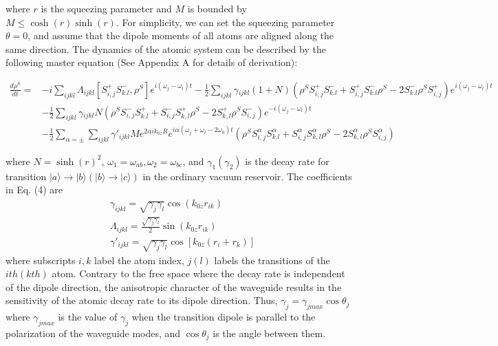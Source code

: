 \documentclass[aps,showpacs,twocolumn,twoside,groupedaddress]{revtex4}
\begin{document}
where $r$ is the squeezing parameter and $M$ is bounded by $M\leq\cosh(r)\sinh(r)$. For simplicity, we can set the squeezing parameter $\theta=0$, and assume that the dipole moments of all atoms are aligned along the same direction. The dynamics of the atomic system can be described by the following master equation (See Appendix A for details of derivation):
\begin{widetext}
\begin{equation}
\label{eq1}
\begin{split}
\frac{d\rho^{S}}{dt}=&-i\underset{ijkl}{\sum}\Lambda_{ijkl}[S_{i,j}^{+}S_{k.l}^{-},\rho^{S}]e^{i(\omega_{j}-\omega_{l})t}-\frac{1}{2}\underset{ijkl}{\sum}\gamma{}_{ijkl}(1+N)(\rho^{S}S_{i,j}^{+}S_{k.l}^{-}+S_{i,j}^{+}S_{k.l}^{-}\rho^{S}-2S_{k.l}^{-}\rho^{S}S_{i,j}^{+})e^{i(\omega_{j}-\omega_{l})t}\\
&-\frac{1}{2}\underset{ijkl}{\sum}\gamma{}_{ijkl}N(\rho^{S}S_{i,j}^{-}S_{k.l}^{+}+S_{i,j}^{-}S_{k,l}^{+}\rho^{S}-2S_{k,l}^{+}\rho^{S}S_{i,j}^{-})e^{-i(\omega_{j}-\omega_{l})t}\\
&-\frac{1}{2}\sum_{\alpha=\pm}\underset{ijkl}{\sum}\gamma'_{ijkl}Me^{2\alpha ik_{0z}R}e^{i\alpha(\omega_{j}+\omega_{l}-2\omega_{0})t}(\rho^{S}S_{i,j}^{\alpha}S_{k.l}^{\alpha}+S_{i,j}^{\alpha}S_{k,l}^{\alpha}\rho^{S}-2S_{k,l}^{\alpha}\rho^{S}S_{i,j}^{\alpha})
\end{split}
\end{equation}
\end{widetext}
where $N=\sinh(r)^2$, $\omega_1=\omega_{ab}, \omega_2=\omega_{bc}$, and $\gamma_{1}(\gamma_{2})$ is the decay rate for transition $|a\rangle\rightarrow|b\rangle(|b\rangle\rightarrow|c\rangle)$ in the ordinary vacuum reservoir. The coefficients in Eq. (4) are
\begin{equation}
\label{eq2}
\begin{split}
& \gamma_{ijkl}=\sqrt{\gamma_{j}\gamma_{l}}\cos(k_{0z}r_{ik}) \\
& \Lambda_{ijkl}=\frac{\sqrt{\gamma_{j}\gamma_{l}}}{2}\sin(k_{0z}r_{ik})\\
& \gamma'_{ijkl}=\sqrt{\gamma_{j}\gamma_{l}}\cos[k_{0z}(r_{i}+r_{k})]
\end{split}
\end{equation}
where subscripts $i,k$ label the atom index, $j(l)$ labels the transitions of the $ith (kth)$ atom. Contrary to the free space where the decay rate is independent of the dipole direction, the anisotropic character of the waveguide results in the sensitivity of the atomic decay rate to its dipole direction. Thus, $\gamma_j=\gamma_{jmax}\cos\theta_j$ where $\gamma_{jmax}$ is the value of $\gamma_{j}$ when the transition dipole is parallel to the polarization of the waveguide modes, and $\cos\theta_j$ is the angle between them.
\end{document}
